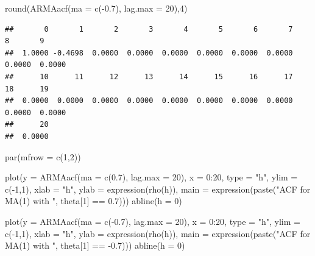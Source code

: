 \documentclass[
]{book}
\newenvironment{Shaded}{\begin{snugshade}}{\end{snugshade}}
\newcommand{\AttributeTok}[1]{\textcolor[rgb]{0.77,0.63,0.00}{#1}}
\newcommand{\DecValTok}[1]{\textcolor[rgb]{0.00,0.00,0.81}{#1}}
\newcommand{\FloatTok}[1]{\textcolor[rgb]{0.00,0.00,0.81}{#1}}
\newcommand{\FunctionTok}[1]{\textcolor[rgb]{0.00,0.00,0.00}{#1}}
\newcommand{\NormalTok}[1]{#1}
\newcommand{\SpecialCharTok}[1]{\textcolor[rgb]{0.00,0.00,0.00}{#1}}
\newcommand{\StringTok}[1]{\textcolor[rgb]{0.31,0.60,0.02}{#1}}
\theoremstyle{definition}
\theoremstyle{definition}
\theoremstyle{definition}
\theoremstyle{definition}
\theoremstyle{remark}
\begin{document}
\begin{Shaded}
\begin{Highlighting}[]
\FunctionTok{round}\NormalTok{(}\FunctionTok{ARMAacf}\NormalTok{(}\AttributeTok{ma =} \FunctionTok{c}\NormalTok{(}\SpecialCharTok{{-}}\FloatTok{0.7}\NormalTok{), }\AttributeTok{lag.max =} \DecValTok{20}\NormalTok{),}\DecValTok{4}\NormalTok{) }
\end{Highlighting}
\end{Shaded}

\begin{verbatim}
##       0       1       2       3       4       5       6       7       8       9 
##  1.0000 -0.4698  0.0000  0.0000  0.0000  0.0000  0.0000  0.0000  0.0000  0.0000 
##      10      11      12      13      14      15      16      17      18      19 
##  0.0000  0.0000  0.0000  0.0000  0.0000  0.0000  0.0000  0.0000  0.0000  0.0000 
##      20 
##  0.0000
\end{verbatim}

\begin{Shaded}
\begin{Highlighting}[]
\FunctionTok{par}\NormalTok{(}\AttributeTok{mfrow =} \FunctionTok{c}\NormalTok{(}\DecValTok{1}\NormalTok{,}\DecValTok{2}\NormalTok{))}


\FunctionTok{plot}\NormalTok{(}\AttributeTok{y =} \FunctionTok{ARMAacf}\NormalTok{(}\AttributeTok{ma =} \FunctionTok{c}\NormalTok{(}\FloatTok{0.7}\NormalTok{), }\AttributeTok{lag.max =} \DecValTok{20}\NormalTok{), }\AttributeTok{x =} \DecValTok{0}\SpecialCharTok{:}\DecValTok{20}\NormalTok{, }\AttributeTok{type =} \StringTok{"h"}\NormalTok{, }\AttributeTok{ylim =} \FunctionTok{c}\NormalTok{(}\SpecialCharTok{{-}}\DecValTok{1}\NormalTok{,}\DecValTok{1}\NormalTok{), }\AttributeTok{xlab =} \StringTok{"h"}\NormalTok{, }\AttributeTok{ylab =} \FunctionTok{expression}\NormalTok{(}\FunctionTok{rho}\NormalTok{(h)),}
       \AttributeTok{main =} \FunctionTok{expression}\NormalTok{(}\FunctionTok{paste}\NormalTok{(}\StringTok{"ACF for MA(1) with "}\NormalTok{, theta[}\DecValTok{1}\NormalTok{] }\SpecialCharTok{==} \FloatTok{0.7}\NormalTok{)))}
\FunctionTok{abline}\NormalTok{(}\AttributeTok{h =} \DecValTok{0}\NormalTok{)}


\FunctionTok{plot}\NormalTok{(}\AttributeTok{y =} \FunctionTok{ARMAacf}\NormalTok{(}\AttributeTok{ma =} \FunctionTok{c}\NormalTok{(}\SpecialCharTok{{-}}\FloatTok{0.7}\NormalTok{), }\AttributeTok{lag.max =} \DecValTok{20}\NormalTok{), }\AttributeTok{x =} \DecValTok{0}\SpecialCharTok{:}\DecValTok{20}\NormalTok{, }\AttributeTok{type =} \StringTok{"h"}\NormalTok{, }\AttributeTok{ylim =} \FunctionTok{c}\NormalTok{(}\SpecialCharTok{{-}}\DecValTok{1}\NormalTok{,}\DecValTok{1}\NormalTok{), }\AttributeTok{xlab =} \StringTok{"h"}\NormalTok{, }\AttributeTok{ylab =} \FunctionTok{expression}\NormalTok{(}\FunctionTok{rho}\NormalTok{(h)),}
       \AttributeTok{main =} \FunctionTok{expression}\NormalTok{(}\FunctionTok{paste}\NormalTok{(}\StringTok{"ACF for MA(1) with "}\NormalTok{, theta[}\DecValTok{1}\NormalTok{] }\SpecialCharTok{==} \SpecialCharTok{{-}}\FloatTok{0.7}\NormalTok{)))}
\FunctionTok{abline}\NormalTok{(}\AttributeTok{h =} \DecValTok{0}\NormalTok{)}
\end{Highlighting}
\end{Shaded}
\end{document}
